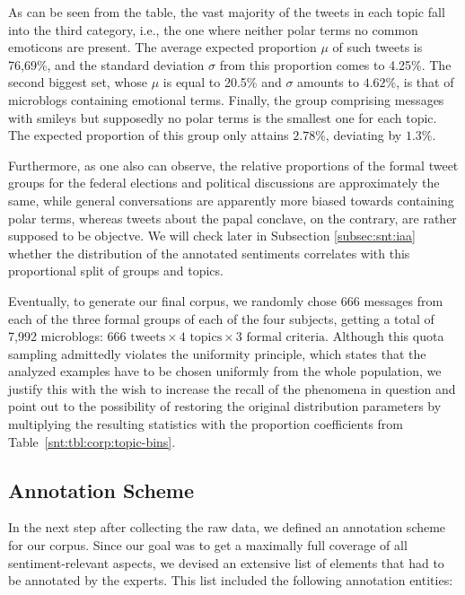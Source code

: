 As can be seen from the table, the vast majority of the tweets in each
topic fall into the third category, i.e., the one where neither polar
terms no common emoticons are present.  The average expected
proportion $\mu$ of such tweets is 76,69\%, and the standard deviation
$\sigma$ from this proportion comes to 4.25\%.  The second biggest
set, whose $\mu$ is equal to 20.5\% and $\sigma$ amounts to $4.62\%$,
is that of microblogs containing emotional terms.  Finally, the group
comprising messages with smileys but supposedly no polar terms is the
smallest one for each topic.  The expected proportion of this group
only attains $2.78\%$, deviating by $1.3\%$.

Furthermore, as one also can observe, the relative proportions of the
formal tweet groups for the federal elections and political
discussions are approximately the same, while general conversations
are apparently more biased towards containing polar terms, whereas
tweets about the papal conclave, on the contrary, are rather supposed
to be objectve.  We will check later in Subsection
\ref{subsec:snt:iaa} whether the distribution of the annotated
sentiments correlates with this proportional split of groups and
topics.

Eventually, to generate our final corpus, we randomly chose 666
messages from each of the three formal groups of each of the four
subjects, getting a total of 7,992 microblogs: $666\text{ tweets}
\times 4\text{ topics} \times 3\text{ formal criteria}$.  Although
this quota sampling admittedly violates the uniformity principle,
which states that the analyzed examples have to be chosen uniformly
from the whole population, we justify this with the wish to increase
the recall of the phenomena in question and point out to the
possibility of restoring the original distribution parameters by
multiplying the resulting statistics with the proportion coefficients
from Table~\ref{snt:tbl:corp:topic-bins}.

\subsection{Annotation Scheme}\label{subsec:snt:ascheme}
In the next step after collecting the raw data, we defined an
annotation scheme for our corpus. Since our goal was to get a
maximally full coverage of all sentiment-relevant aspects, we devised
an extensive list of elements that had to be annotated by the experts.
This list included the following annotation entities:

